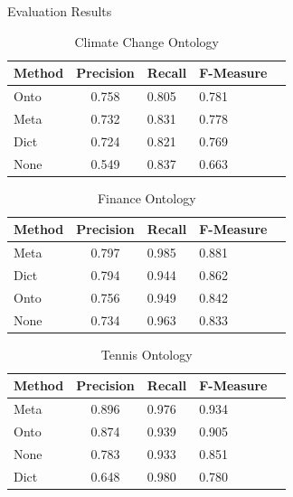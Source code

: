 \documentclass[final,hyperref={pdfpagelabels=true}]{beamer}
\begin{document}
\begin{frame}
\begin{columns}[t, onlytextwidth]
\begin{column}{\textwidth}
\begin{columns}[t, onlytextwidth]
\begin{column}{.49\textwidth}
\begin{block}{Evaluation Results}
\begin{minipage}[t][.22\textheight][c]{\textwidth}
\begin{minipage}[t]{0.93\textwidth}
\begin{minipage}[t]{\textwidth}
\begin{minipage}[t]{.48\textwidth}
									\begin{table}
										\scriptsize
										\captionsetup{font=scriptsize}
										\begin{tabularx}{\textwidth}{l c*{3}{Y}}
											\toprule
											Method & Precision & Recall & F-Measure \\
											\midrule
											 Onto & 0.758 & 0.805 & 0.781 \\
											 Meta & 0.732 & 0.831 & 0.778 \\
											 Dict & 0.724 & 0.821 & 0.769 \\
											 None & 0.549 & 0.837 & 0.663 \\
											\bottomrule
										\end{tabularx}
										\caption{Climate Change Ontology}
									\end{table}
									
									\begin{table}
										\scriptsize
										\captionsetup{font=scriptsize}
										\begin{tabularx}{\textwidth}{l c*{3}{Y}}
											\toprule
											Method & Precision & Recall & F-Measure \\
											\midrule
											 Meta & 0.797 & 0.985 & 0.881 \\
											 Dict & 0.794 & 0.944 & 0.862 \\
											 Onto & 0.756 & 0.949 & 0.842 \\
											 None & 0.734 & 0.963 & 0.833 \\
											\bottomrule
										\end{tabularx}
										\caption{Finance Ontology}
									\end{table}
									\begin{table}
										\scriptsize
										\captionsetup{font=scriptsize}
										\begin{tabularx}{\textwidth}{l c*{3}{Y}}
											\toprule
											Method & Precision & Recall & F-Measure \\
											\midrule
											 Meta & 0.896 & 0.976 & 0.934 \\
											 Onto & 0.874 & 0.939 & 0.905 \\ 
											 None & 0.783 & 0.933 & 0.851 \\
											 Dict & 0.648 & 0.980 & 0.780 \\
											\bottomrule
										\end{tabularx}
										\caption{Tennis Ontology}
									\end{table}
									

\end{minipage}
\end{minipage}
\end{minipage}
\end{minipage}
\end{block}
\end{column}
\end{columns}
\end{column}
\end{columns}
\end{frame}
\end{document}
